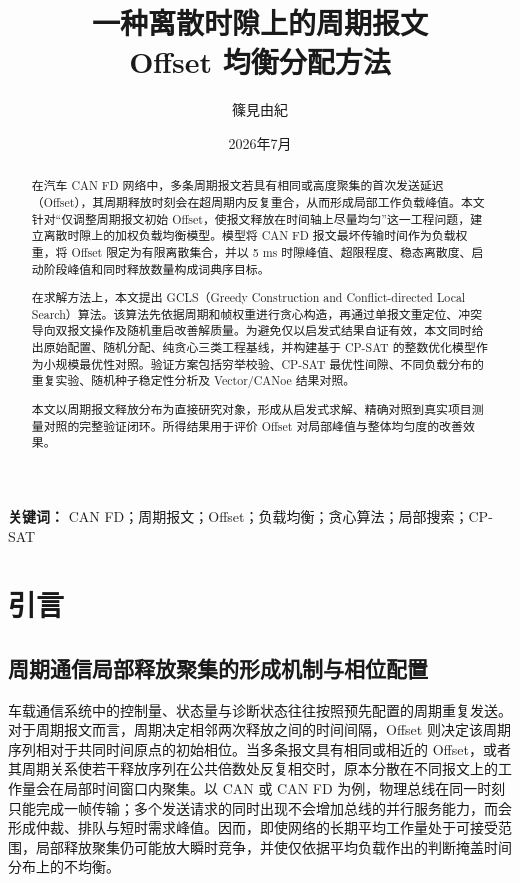 \documentclass[UTF8,12pt,a4paper]{ctexart}
\title{\bfseries 一种离散时隙上的周期报文\\Offset 均衡分配方法}
\author{篠見由紀}
\date{2026年7月}
\begin{document}
\maketitle

\begin{abstract}
在汽车 CAN FD 网络中，多条周期报文若具有相同或高度聚集的首次发送延迟（Offset），其周期释放时刻会在超周期内反复重合，从而形成局部工作负载峰值。本文针对“仅调整周期报文初始 Offset，使报文释放在时间轴上尽量均匀”这一工程问题，建立离散时隙上的加权负载均衡模型。模型将 CAN FD 报文最坏传输时间作为负载权重，将 Offset 限定为有限离散集合，并以 5 ms 时隙峰值、超限程度、稳态离散度、启动阶段峰值和同时释放数量构成词典序目标。

在求解方法上，本文提出 GCLS（Greedy Construction and Conflict-directed Local Search）算法。该算法先依据周期和帧权重进行贪心构造，再通过单报文重定位、冲突导向双报文操作及随机重启改善解质量。为避免仅以启发式结果自证有效，本文同时给出原始配置、随机分配、纯贪心三类工程基线，并构建基于 CP-SAT 的整数优化模型作为小规模最优性对照。验证方案包括穷举校验、CP-SAT 最优性间隙、不同负载分布的重复实验、随机种子稳定性分析及 Vector/CANoe 结果对照。

本文以周期报文释放分布为直接研究对象，形成从启发式求解、精确对照到真实项目测量对照的完整验证闭环。所得结果用于评价 Offset 对局部峰值与整体均匀度的改善效果。
\end{abstract}

\noindent\textbf{关键词：} CAN FD；周期报文；Offset；负载均衡；贪心算法；局部搜索；CP-SAT

\tableofcontents
\newpage

\section{引言}

\subsection{周期通信局部释放聚集的形成机制与相位配置}

车载通信系统中的控制量、状态量与诊断状态往往按照预先配置的周期重复发送。对于周期报文而言，周期决定相邻两次释放之间的时间间隔，Offset 则决定该周期序列相对于共同时间原点的初始相位。当多条报文具有相同或相近的 Offset，或者其周期关系使若干释放序列在公共倍数处反复相交时，原本分散在不同报文上的工作量会在局部时间窗口内聚集。以 CAN 或 CAN FD 为例，物理总线在同一时刻只能完成一帧传输；多个发送请求的同时出现不会增加总线的并行服务能力，而会形成仲裁、排队与短时需求峰值。因而，即使网络的长期平均工作量处于可接受范围，局部释放聚集仍可能放大瞬时竞争，并使仅依据平均负载作出的判断掩盖时间分布上的不均衡。
\end{document}
